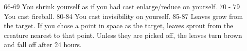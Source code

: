 66-69                                             You shrink yourself as if you had cast  enlarge/reduce on yourself.                                                                                                                                                                                                                                                                                                                                                                                                                                                                                                                                                     
70 - 79                                           You cast fireball.                                                                                                                                                                                                                                                                                                                                                                                                                                                                                                                                                                                                      
80-84                                             You cast invisibility on yourself.                                                                                                                                                                                                                                                                                                                                                                                                                                                                                                                                                                                      
85-87                                             Leaves grow from the target. If you chose a point  in space as the target, leaves sprout  from the  creature nearest to that point. Unless they are picked off, the leaves turn brown and fall off  after 24 hours.                                                                                                                                                                                                                                                                                                                                                                                                     
